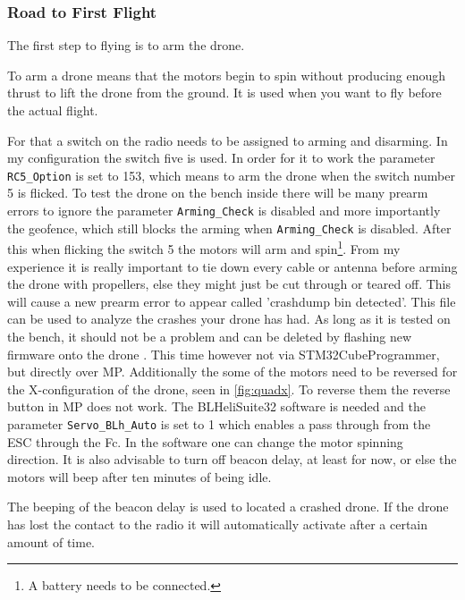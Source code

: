 \documentclass[svgnames]{article}
\begin{document}
	\subsubsection{Road to First Flight}
	The first step to flying is to arm the drone.
	\begin{Explanation}[to arm]
		\item To arm a drone means that the motors begin to spin without producing enough thrust to lift the drone from the ground. It is used when you want to fly before the actual flight.		
	\end{Explanation}
	For that a switch on the radio needs to be assigned to arming and disarming. In my configuration the switch five is used. In order for it to work the parameter \lstinline|RC5_Option| is set to 153, which means to arm the drone when the switch number 5 is flicked. To test the drone on the bench inside there will be many prearm errors to ignore the parameter \lstinline|Arming_Check| is disabled and more importantly the geofence, which still blocks the arming when \lstinline|Arming_Check| is disabled. After this when flicking the switch 5 the motors will arm and spin\footnote{A battery needs to be connected.}. From my experience it is really important to tie down every cable or antenna before arming the drone with propellers, else they might just be cut through or teared off. This will cause a new prearm error to appear called 'crashdump bin detected'. This file can be used to analyze the crashes your drone has had. As long as it is tested on the bench, it should not be a problem and can be deleted by flashing new firmware onto the drone \cite{blogcrashdump}. This time however not via STM32CubeProgrammer, but directly over \gls{MP}. Additionally the some of the motors need to be reversed for the X-configuration of the drone, seen in \cref{fig:quadx}. To reverse them the reverse button in \gls{MP} does not work. The BLHeliSuite32 software is needed and the parameter \lstinline|Servo_BLh_Auto| is set to 1 which enables a pass through from the \gls{ESC} through the \gls{Fc}. In the software one can change the motor spinning direction. It is also advisable to turn off beacon delay, at least for now, or else the motors will beep after ten minutes of being idle.
	\begin{Explanation}
		\item The beeping of the beacon delay is used to located a crashed drone. If the drone has lost the contact to the radio it will automatically activate after a certain amount of time.
	\end{Explanation}
	
\end{document}
